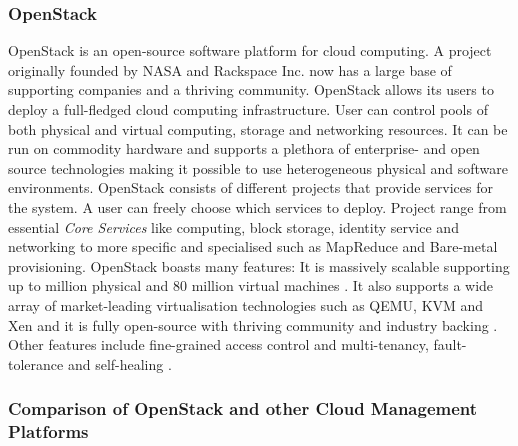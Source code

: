 \subsubsection{OpenStack}

OpenStack \cite{openstackproject} is an open-source software platform for cloud computing. A project originally founded by NASA and Rackspace Inc. now has a large base of supporting companies  \cite{openstackpartners} and a thriving community.
	OpenStack allows its users to deploy a full-fledged cloud computing infrastructure. User can control pools of both physical and virtual computing, storage and networking resources. It can be run on commodity hardware and supports a plethora of enterprise- and open source technologies making it possible to use heterogeneous physical and software environments.
	OpenStack consists of different projects that provide services for the system. A user can freely choose which services to deploy. Project range from essential \textit{Core Services} like computing, block storage, identity service and networking to more specific and specialised such as MapReduce and Bare-metal provisioning\cite{openstackproject}. OpenStack boasts many features: It is massively scalable supporting up to million physical and 80 million virtual machines \cite{openstack}. It also supports a wide array of market-leading virtualisation technologies such as QEMU, KVM and Xen and it is fully open-source with thriving community and industry backing \cite{openstackpartners}. Other features include fine-grained access control and multi-tenancy, fault-tolerance and self-healing \cite{openstackfeatures}.

\subsubsection{Comparison of OpenStack and other Cloud Management Platforms}

